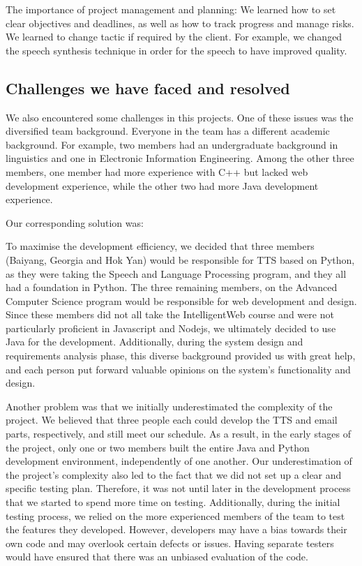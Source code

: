 \documentclass{article}
\begin{document}
The importance of project management and planning: We learned how to set clear objectives and deadlines, as well as how to track progress and manage risks. We learned to change tactic if required by the client. For example, we changed the speech synthesis technique in order for the speech to have improved quality.

\subsection{Challenges we have faced and resolved}

We also encountered some challenges in this projects. One of these issues was the diversified team background. Everyone in the team has a different academic background. For example, two members had an undergraduate background in linguistics and one in Electronic Information Engineering. Among the other three members, one member had more experience with C++ but lacked web development experience, while the other two had more Java development experience.

Our corresponding solution was:

 To maximise the development efficiency, we decided that three members (Baiyang, Georgia and Hok Yan) would be responsible for TTS based on Python, as they were taking the Speech and Language Processing program, and they all had a foundation in Python. The three remaining members, on the Advanced Computer Science program would be responsible for web development and design. Since these members did not all take the IntelligentWeb course and were not particularly proficient in Javascript and Nodejs, we ultimately decided to use Java for the development. Additionally, during the system design and requirements analysis phase, this diverse background provided us with great help, and each person put forward valuable opinions on the system's functionality and design.

Another problem was that we initially underestimated the complexity of the project. We believed that three people each could develop the TTS and email parts, respectively, and still meet our schedule. As a result, in the early stages of the project, only one or two members built the entire Java and Python development environment, independently of one another. Our underestimation of the project's complexity also led to the fact that we did not set up a clear and specific testing plan. Therefore, it was not until later in the development process that we started to spend more time on testing. Additionally, during the initial testing process, we relied on the more experienced members of the team to test the features they developed. However, developers may have a bias towards their own code and may overlook certain defects or issues. Having separate testers would have ensured that there was an unbiased evaluation of the code.
\end{document}
